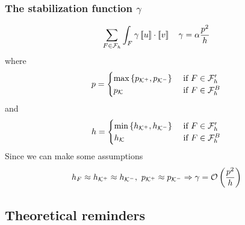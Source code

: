 \subsubsection*{The stabilization function \texorpdfstring{\(\gamma\)}{gamma}}
\[
    \sum_{F \in \mathcal{F}_h} \int_F \gamma \left[\!\left[u\right]\!\right] \cdot \left[\!\left[v\right]\!\right] \quad \gamma = \alpha \frac{p^2}{h}
\]
where 
\[
    p =\begin{cases}
        \max\left\{ p_{\mathcal{K}^+}, p_{\mathcal{K}^-} \right\} & \text{ if } F \in \mathcal{F}'_h \\
        p_{\mathcal{K}} & \text{ if } F \in \mathcal{F}^B_h
    \end{cases}
\]
and 
\[
    h =\begin{cases}
        \min\left\{ h_{\mathcal{K}^+}, h_{\mathcal{K}^-} \right\} & \text{ if } F \in \mathcal{F}'_h \\
        h_{\mathcal{K}} & \text{ if } F \in \mathcal{F}^B_h
    \end{cases}
\]
Since we can make some assumptions 
\[
    h_F \approx h_{\mathcal{K}^+} \approx h_{\mathcal{K}^-}, \ p_{\mathcal{K}^+} \approx p_{\mathcal{K}^-} \Rightarrow \gamma = \mathcal{O}\left( \frac{p^2}{h} \right)
\]

\subsection{Theoretical reminders}

